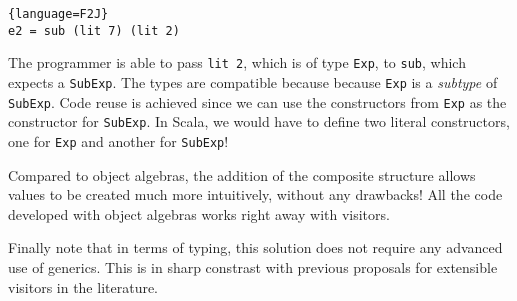 \begin{lstlisting}{language=F2J}
e2 = sub (lit 7) (lit 2)
\end{lstlisting}

\noindent The programmer is able to pass \lstinline{lit 2}, which is of type \lstinline{Exp},
to \lstinline{sub}, which expects a \lstinline{SubExp}. The types are compatible
because because \lstinline$Exp$ is a \emph{subtype} of \lstinline$SubExp$. Code
reuse is achieved since we can use the constructors from \lstinline$Exp$ as the
constructor for \lstinline$SubExp$. In Scala, we would have to define two
literal constructors, one for \lstinline$Exp$ and another for
\lstinline$SubExp$! 

Compared to object algebras, the addition of the composite structure
allows values to be created much more intuitively, without any
drawbacks! All the code developed with object algebras works right
away with visitors. 

Finally note that in terms of typing, this solution does not require
any advanced use of generics. This is in sharp constrast with previous 
proposals for extensible visitors in the literature.





